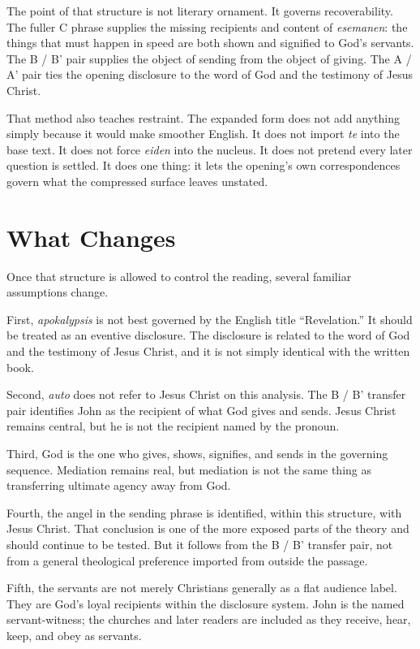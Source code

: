 The point of that structure is not literary ornament. It governs recoverability. The fuller C phrase supplies the missing recipients and content of \textit{esemanen}: the things that must happen in speed are both shown and signified to God's servants. The B / B' pair supplies the object of sending from the object of giving. The A / A' pair ties the opening disclosure to the word of God and the testimony of Jesus Christ.

That method also teaches restraint. The expanded form does not add anything simply because it would make smoother English. It does not import \textit{te} into the base text. It does not force \textit{eiden} into the nucleus. It does not pretend every later question is settled. It does one thing: it lets the opening's own correspondences govern what the compressed surface leaves unstated.

\section{What Changes}

Once that structure is allowed to control the reading, several familiar assumptions change.

First, \textit{apokalypsis} is not best governed by the English title ``Revelation.'' It should be treated as an eventive disclosure. The disclosure is related to the word of God and the testimony of Jesus Christ, and it is not simply identical with the written book.

Second, \textit{auto} does not refer to Jesus Christ on this analysis. The B / B' transfer pair identifies John as the recipient of what God gives and sends. Jesus Christ remains central, but he is not the recipient named by the pronoun.

Third, God is the one who gives, shows, signifies, and sends in the governing sequence. Mediation remains real, but mediation is not the same thing as transferring ultimate agency away from God.

Fourth, the angel in the sending phrase is identified, within this structure, with Jesus Christ. That conclusion is one of the more exposed parts of the theory and should continue to be tested. But it follows from the B / B' transfer pair, not from a general theological preference imported from outside the passage.

Fifth, the servants are not merely Christians generally as a flat audience label. They are God's loyal recipients within the disclosure system. John is the named servant-witness; the churches and later readers are included as they receive, hear, keep, and obey as servants.

